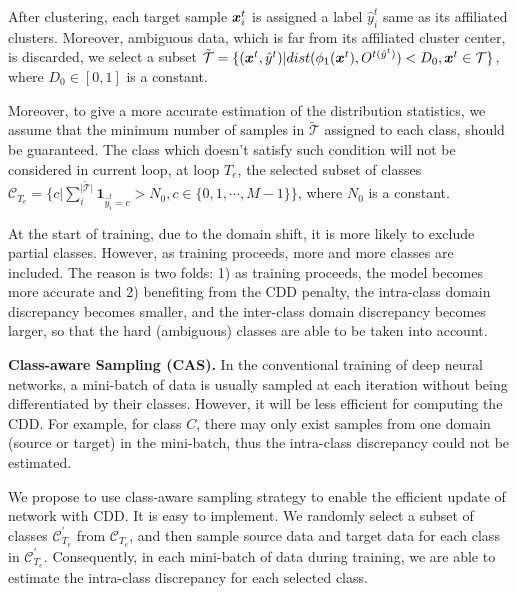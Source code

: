 \documentclass[10pt,twocolumn,letterpaper]{article}
\begin{document}
After clustering, each target sample $\boldsymbol{x}_{i}^t$ is assigned a label $\hat{y}_i^t$ same as its affiliated clusters.
Moreover, ambiguous data, which is far from its affiliated cluster center, is discarded,
\ie we select a subset
$\mathcal{\tilde{T}} = \{
(\boldsymbol{x}^t,\hat{y}^t) | dist(\phi_{1}(\boldsymbol{x}^t), O^{t(\hat{y}^t)}) < D_0, \boldsymbol{x}^t\in\mathcal{T}\}
\label{eq:sample-filtering}
$,
where $D_0\in [0, 1]$ is a constant.



Moreover, to give a more accurate estimation of the distribution statistics, we assume that the minimum number of samples in $\mathcal{\tilde{T}}$ assigned to each class, should be guaranteed.
The class which doesn't satisfy such condition will not be considered in current loop, \ie
at loop $T_e$, the selected subset of classes 
$\mathcal{C}_{T_e} = \{c | \sum_i^{\lvert \mathcal{\tilde{T}}\rvert}{\mathbf{1}_{\hat{y}_i^t=c}} > N_0, c\in \{0, 1, \cdots, M-1\}\}
\label{eq:class-filtering}
$,
where $N_0$ is a constant.


At the start of training, due to the domain shift, 
it is more likely to exclude partial classes.
However, as training proceeds,   
more and more classes are included.
The reason is two folds: 
1) as training proceeds, the model becomes more accurate 
and 
2) benefiting from the CDD penalty, 
the intra-class domain discrepancy becomes smaller, 
and the inter-class domain discrepancy becomes larger, 
so that the hard (\ie ambiguous) classes are able to be taken into account.







\textbf{Class-aware Sampling (CAS).}
In the conventional training of deep neural networks, 
a mini-batch of data is usually sampled at each iteration 
without being differentiated by their classes.
However, it will be less efficient for computing the CDD.
For example, for class $C$, 
there may only exist samples from one domain (source or target) in the mini-batch, 
thus the intra-class discrepancy could not be estimated.

We propose to use class-aware sampling strategy to 
enable the efficient update of network with CDD.
It is easy to implement. 
We randomly select a subset of classes $\mathcal{C}^{'}_{T_e}$ from $\mathcal{C}_{T_e}$,
and then sample source data and target data for each class in $\mathcal{C}^{'}_{T_e}$.
Consequently, in each mini-batch of data during training, 
we are able to estimate the intra-class discrepancy for each selected class. 
\end{document}

